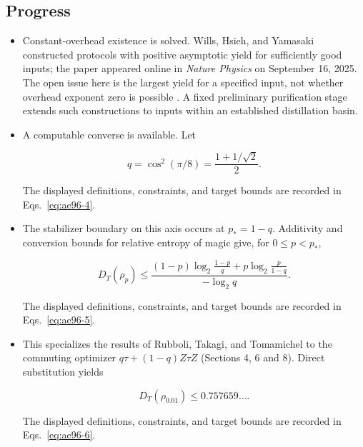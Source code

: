 \subsection*{Progress}

\begin{itemize}
  \item Constant-overhead existence is solved. Wills, Hsieh, and Yamasaki constructed protocols with positive asymptotic yield for sufficiently good inputs; the paper appeared online in \emph{Nature Physics} on September 16, 2025. The open issue here is the largest yield for a specified input, not whether overhead exponent zero is possible . A fixed preliminary purification stage extends such constructions to inputs within an established distillation basin.

  \item A computable converse is available. Let

\begin{equation}
q=\cos^2(\pi/8)=\frac{1+1/\sqrt2}{2}.
\label{eq:ae96-4}
\end{equation}

The displayed definitions, constraints, and target bounds are recorded in Eqs.~\eqref{eq:ae96-4}.

  \item The stabilizer boundary on this axis occurs at $p_*=1-q$. Additivity and conversion bounds for relative entropy of magic give, for $0\leq p<p_*$,

\begin{equation}
D_T(\rho_p)\leq
\frac{(1-p)\log_2\frac{1-p}{q}
+p\log_2\frac{p}{1-q}}
{-\log_2q}.
\label{eq:ae96-5}
\end{equation}

The displayed definitions, constraints, and target bounds are recorded in Eqs.~\eqref{eq:ae96-5}.

  \item This specializes the results of Rubboli, Takagi, and Tomamichel to the commuting optimizer $q\tau+(1-q)Z\tau Z$  (Sections 4, 6 and 8). Direct substitution yields

\begin{equation}
D_T(\rho_{0.01})\leq0.757659\ldots.
\label{eq:ae96-6}
\end{equation}

The displayed definitions, constraints, and target bounds are recorded in Eqs.~\eqref{eq:ae96-6}.


\end{itemize}
